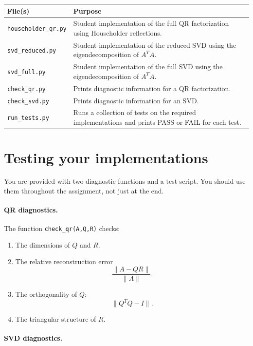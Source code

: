 \documentclass{ximera}
\begin{document}
\begin{center}
\begin{tabular}{|p{4cm}|p{9cm}|}
\hline
File(s) & Purpose\\
\hline
\texttt{householder\_qr.py} &
Student implementation of the full QR factorization using
Householder reflections.\\
\hline
\texttt{svd\_reduced.py} &
Student implementation of the reduced SVD using the eigendecomposition
of $A^TA$.\\
\hline
\texttt{svd\_full.py} &
Student implementation of the full SVD using the eigendecomposition
of $A^TA$.\\
\hline
\texttt{check\_qr.py} &
Prints diagnostic information for a QR factorization.\\
\hline
\texttt{check\_svd.py} &
Prints diagnostic information for an SVD.\\
\hline
\texttt{run\_tests.py} &
Runs a collection of tests on the required implementations and
prints PASS or FAIL for each test.\\
\hline
\end{tabular}
\end{center}

\section*{Testing your implementations}

You are provided with two diagnostic functions and a test script.
You should use them throughout the assignment, not just at the end.

\paragraph{QR diagnostics.}

The function \texttt{check\_qr(A,Q,R)} checks:

\begin{enumerate}
    \item The dimensions of $Q$ and $R$.
    \item The relative reconstruction error
    \[
    \frac{\|A-QR\|}{\|A\|}.
    \]
    \item The orthogonality of $Q$:
    \[
    \|Q^TQ-I\|.
    \]
    \item The triangular structure of $R$.
\end{enumerate}

\paragraph{SVD diagnostics.}
\end{document}
